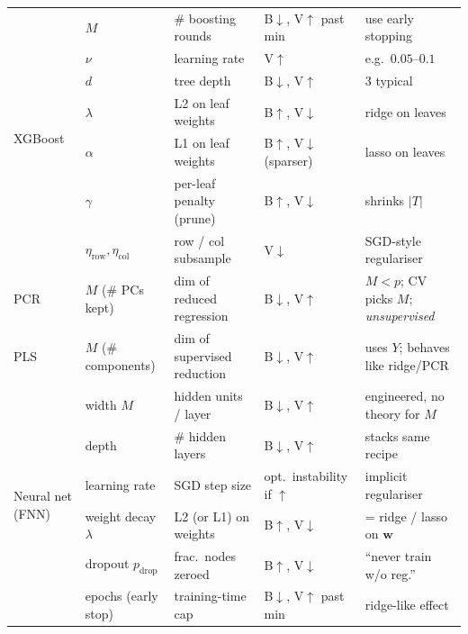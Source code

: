 {\begin{center}
\begin{tabular*}{\textwidth}{@{\extracolsep{\fill}} l l l l l @{}}
\multirow{7}{*}{XGBoost}
                   & $M$                 & \# boosting rounds           & B$\downarrow$, V$\uparrow$ past min  & use early stopping \\
                   & $\nu$               & learning rate                & V$\uparrow$                          & e.g.\ $0.05$--$0.1$ \\
                   & $d$                 & tree depth                   & B$\downarrow$, V$\uparrow$           & $3$ typical \\
                   & $\lambda$           & L2 on leaf weights           & B$\uparrow$, V$\downarrow$           & ridge on leaves \\
                   & $\alpha$            & L1 on leaf weights           & B$\uparrow$, V$\downarrow$ (sparser) & lasso on leaves \\
                   & $\gamma$            & per-leaf penalty (prune)     & B$\uparrow$, V$\downarrow$           & shrinks $|T|$ \\
                   & $\eta_{\text{row}}, \eta_{\text{col}}$ & row / col subsample & V$\downarrow$               & SGD-style regulariser \\
\midrule

PCR                & $M$ (\# PCs kept)   & dim of reduced regression    & B$\downarrow$, V$\uparrow$           & $M{<}p$; CV picks $M$; \emph{unsupervised} \\
\midrule

PLS                & $M$ (\# components) & dim of supervised reduction  & B$\downarrow$, V$\uparrow$           & uses $Y$; behaves like ridge/PCR \\
\midrule

\multirow{6}{*}{Neural net (FNN)}
                   & width $M$           & hidden units / layer         & B$\downarrow$, V$\uparrow$           & engineered, no theory for $M$ \\
                   & depth               & \# hidden layers             & B$\downarrow$, V$\uparrow$           & stacks same recipe \\
                   & learning rate       & SGD step size                & opt.\ instability if $\uparrow$      & implicit regulariser \\
                   & weight decay $\lambda$ & L2 (or L1) on weights     & B$\uparrow$, V$\downarrow$           & = ridge / lasso on $\mathbf w$ \\
                   & dropout $p_{\text{drop}}$ & frac.\ nodes zeroed    & B$\uparrow$, V$\downarrow$           & ``never train w/o reg.'' \\
                   & epochs (early stop) & training-time cap            & B$\downarrow$, V$\uparrow$ past min  & ridge-like effect \\
\midrule


\end{tabular*}
\end{center}}
